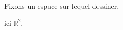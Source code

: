 \documentclass[preview]{standalone}
\begin{document}
\begin{center}
Fixons un espace sur lequel dessiner,
        
 ici $\mathbb{R}^2$.
\end{center}
\end{document}
